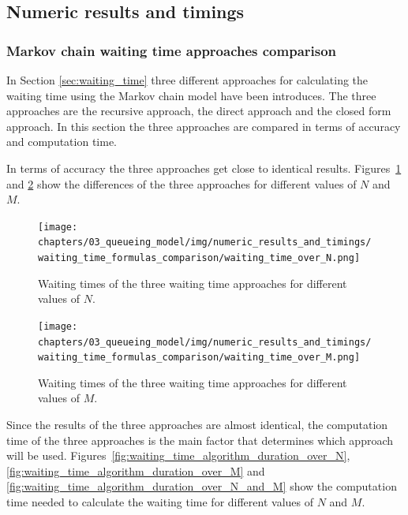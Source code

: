 \subsection{Numeric results and timings}\label{sec:truncation_effect}

\subsubsection{Markov chain waiting time approaches comparison}
\label{sec:waiting_time_approach_comparison}

In Section \ref{sec:waiting_time} three different approaches for calculating
the waiting time using the Markov chain model have been introduces.
The three approaches are the recursive approach, the direct approach and
the closed form approach.
In this section the three approaches are compared in terms of accuracy and
computation time.

In terms of accuracy the three approaches get close to identical results.
Figures~\ref{fig:waiting_time_accuracy_over_N} and
\ref{fig:waiting_time_accuracy_over_M} show the differences of the three
approaches for different values of \(N\) and \(M\).


\begin{figure}[H]
    \texttt{[image: chapters/03\_queueing\_model/img/numeric\_results\_and\_timings/waiting\_time\_formulas\_comparison/waiting\_time\_over\_N.png]}
    \caption{Waiting times of the three waiting time approaches for different
    values of \(N\).}
    \label{fig:waiting_time_accuracy_over_N}
\end{figure}
    
\begin{figure}[H]
    \texttt{[image: chapters/03\_queueing\_model/img/numeric\_results\_and\_timings/waiting\_time\_formulas\_comparison/waiting\_time\_over\_M.png]}
    \caption{Waiting times of the three waiting time approaches for different
    values of \(M\).}
    \label{fig:waiting_time_accuracy_over_M}
\end{figure}


Since the results of the three approaches are almost identical, the computation
time of the three approaches is the main factor that determines which
approach will be used.
Figures~\ref{fig:waiting_time_algorithm_duration_over_N}, 
\ref{fig:waiting_time_algorithm_duration_over_M} and 
\ref{fig:waiting_time_algorithm_duration_over_N_and_M} show the computation
time needed to calculate the waiting time for different values of \(N\) and
\(M\).

